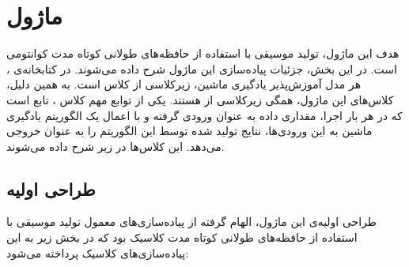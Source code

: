 
\section{ماژول
} \label{sec:qlstm_module}
هدف این ماژول، تولید موسیقی با استفاده از حافظه‌های طولانی کوتاه مدت کوانتومی است. در این بخش، جزئیات پیاده‌سازی این ماژول شرح داده می‌شوند.
در کتابخانه‌ی 
،
هر مدل آموزش‌پذیر یادگیری ماشین، زیرکلاسی از کلاس 
است. به همین دلیل، کلاس‌های این ماژول، همگی زیرکلاسی از
هستند.
یکی از توابع مهم کلاس
،
تابع
است که در هر بار اجرا، مقداری داده به عنوان ورودی گرفته و با اعمال یک الگوریتم یادگیری ماشین به این ورودی‌ها، نتایج تولید شده توسط این الگوریتم را به عنوان خروجی می‌دهد.
این کلاس‌ها در زیر شرح داده می‌شوند.

\subsection{طراحی اولیه}
طراحی اولیه‌ی این ماژول، الهام گرفته از پیاده‌سازی‌های معمول تولید موسیقی با استفاده از حافظه‌های طولانی کوتاه مدت کلاسیک بود که در بخش زیر به این پیاده‌سازی‌های کلاسیک پرداخته می‌شود:
